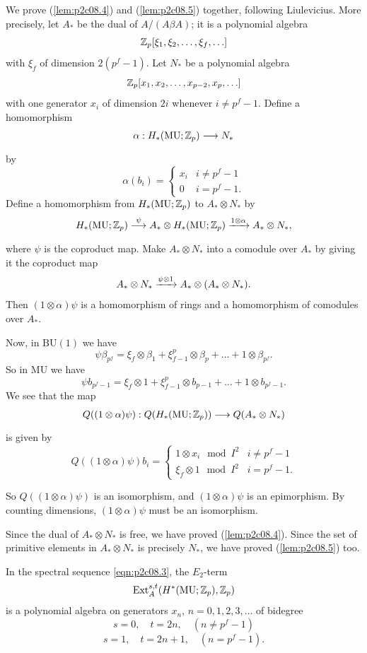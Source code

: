\documentclass[../main]{subfiles}
\begin{document}
We prove (\ref{lem:p2c08.4}) and (\ref{lem:p2c08.5}) together, following Liulevicius. More precisely, let $A_\ast$ be the dual of $A/(A \beta A)$; it is a polynomial algebra \[\mathbb{Z}_p[\xi_1, \xi_2, \ldots, \xi_f, \ldots]\] with $\xi_f$ of dimension $2(p^f - 1)$. Let $N_\ast$ be a polynomial algebra \[\mathbb{Z}_p[x_1, x_2, \ldots, x_{p - 2}, x_p, \ldots]\] with one generator $x_i$ of dimension $2i$ whenever $i \ne p^f - 1$. Define a homomorphism \[\alpha : H_\ast(\mathrm{MU}; \bbZ_p) \lar{} N_\ast\] by \[\alpha(b_i) = \begin{cases}x_i & i \ne p^f - 1 \\ 0 & i = p^f - 1.\end{cases}\] Define a homomorphism from $H_\ast(\mathrm{MU}; \mathbb{Z}_p)$ to $A_\ast \otimes N_\ast$ by \[H_\ast(\mathrm{MU}; \bbZ_p) \lar{\psi} A_\ast \otimes H_\ast(\mathrm{MU}; \bbZ_p) \lar{1 \otimes \alpha} A_\ast \otimes N_\ast,\] where $\psi$ is the coproduct map. Make $A_\ast \otimes N_\ast$ into a comodule over $A_\ast$ by giving it the coproduct map \[A_\ast \otimes N_\ast \lar{\psi \otimes 1} A_\ast \otimes (A_\ast \otimes N_\ast).\] Then $(1 \otimes \alpha) \psi$ is a homomorphism of rings and a homomorphism of comodules over $A_\ast$.

Now, in $\mathrm{BU}(1)$ we have \[\psi \beta_{p^f} = \xi_f \otimes \beta_1 + \xi_{f-1}^p \otimes \beta_p + \ldots + 1 \otimes \beta_{p^f}.\] So in $\mathrm{MU}$ we have \[\psi b_{p^f - 1} = \xi_f \otimes 1 + \xi_{f - 1}^p \otimes b_{p - 1} + \ldots + 1 \otimes b_{p^f - 1}.\] We see that the map \[Q((1 \otimes \alpha) \psi) : Q(H_\ast(\mathrm{MU}; \bbZ_p)) \lar{} Q(A_\ast \otimes N_\ast)\] is given by \[Q((1 \otimes \alpha) \psi) b_i = \begin{cases}1 \otimes x_i \mod I^2 & i \ne p^f - 1 \\ \xi_f \otimes 1 \mod I^2 & i = p^f - 1.\end{cases}\]

So $Q((1 \otimes \alpha)\psi)$ is an isomorphism, and $(1 \otimes \alpha) \psi$ is an epimorphism. By counting dimensions, $(1 \otimes \alpha) \psi$ must be an isomorphism. 

Since the dual of $A_\ast \otimes N_\ast$ is free, we have proved (\ref{lem:p2c08.4}). Since the set of primitive elements in $A_\ast \otimes N_\ast$ is precisely $N_\ast$, we have proved (\ref{lem:p2c08.5}) too.

\begin{corollary}
\label{cor:p2c08.6}
In the spectral sequence \eqref{eqn:p2c08.3}, the $E_2$-term \[\mathrm{Ext}_A^{s, t} (H^\ast(\mathrm{MU}; \mathbb{Z}_p), \mathbb{Z}_p)\] is a polynomial algebra on generators $x_n$, $n = 0, 1, 2, 3, \ldots$ of bidegree 
\[s = 0, \quad t = 2n, \quad (n \ne p^f - 1)\]
\[s = 1, \quad t = 2n + 1, \quad (n = p^f - 1).\]
\end{corollary}
\end{document}

